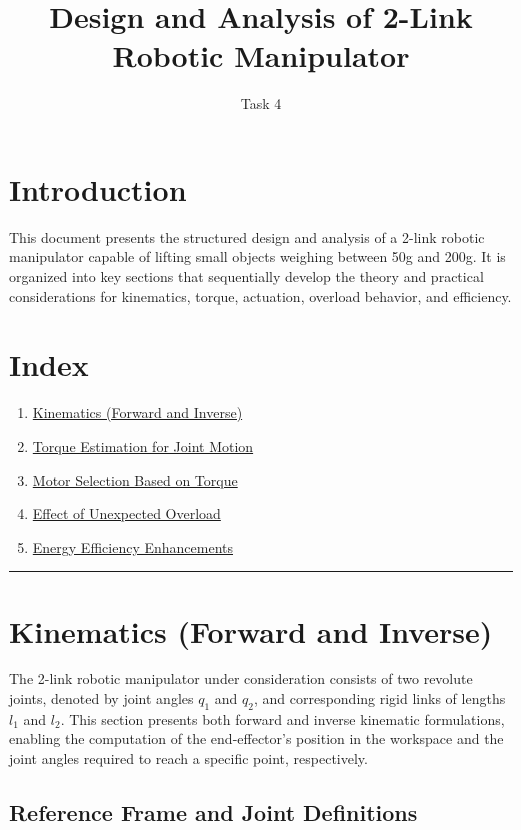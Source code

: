 \documentclass[a4paper,12pt]{article}
\title{ Design and Analysis of 2-Link Robotic Manipulator}
\author{Task 4}
\date{}
\begin{document}
\maketitle

\section*{Introduction}
This document presents the structured design and analysis of a 2-link robotic manipulator capable of lifting small objects weighing between 50g and 200g. It is organized into key sections that sequentially develop the theory and practical considerations for kinematics, torque, actuation, overload behavior, and efficiency.

\section*{Index}
\begin{enumerate}
    \item \hyperref[sec:kinematics]{Kinematics (Forward and Inverse)}
    \item \hyperref[sec:torque]{Torque Estimation for Joint Motion}
    \item \hyperref[sec:motors]{Motor Selection Based on Torque}
    \item \hyperref[sec:overload]{Effect of Unexpected Overload}
    \item \hyperref[sec:efficiency]{Energy Efficiency Enhancements}
\end{enumerate}
\vspace{1em}
\noindent\rule{\linewidth}{0.6pt}
\vspace{1em}
\section{Kinematics (Forward and Inverse)} \label{sec:kinematics}

The 2-link robotic manipulator under consideration consists of two revolute joints, denoted by joint angles $q_1$ and $q_2$, and corresponding rigid links of lengths $l_1$ and $l_2$. This section presents both forward and inverse kinematic formulations, enabling the computation of the end-effector's position in the workspace and the joint angles required to reach a specific point, respectively.

\subsection*{Reference Frame and Joint Definitions}
\end{document}
